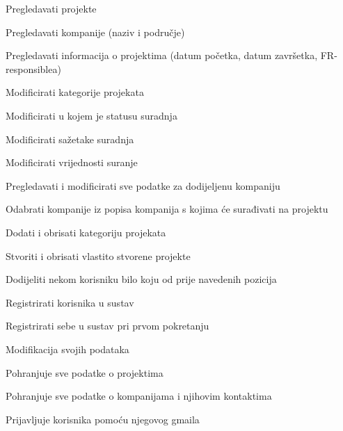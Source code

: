 \begin{packed_enum}
\begin{packed_enum}
				\end{packed_enum}

				\item  {}

				\begin{packed_enum}

					\item Pregledavati projekte
					\item Pregledavati kompanije (naziv i područje)
					\item Pregledavati informacija o projektima (datum početka, datum završetka, FR-responsiblea)
					\item Modificirati kategorije projekata
					\item Modificirati u kojem je statusu suradnja
					\item Modificirati sažetake suradnja
					\item Modificirati vrijednosti suranje
					\item Pregledavati i modificirati sve podatke za dodijeljenu kompaniju
					\item Odabrati kompanije iz popisa kompanija s kojima će surađivati na projektu
					\item Dodati i obrisati kategoriju projekata
					\item Stvoriti i obrisati vlastito stvorene projekte
					\item Dodijeliti nekom korisniku bilo koju od prije navedenih pozicija
					\item Registrirati korisnika u sustav
					\item Registrirati sebe u sustav pri prvom pokretanju
					\item Modifikacija svojih podataka

				\end{packed_enum}
			
				\item  {}
				
				\begin{packed_enum}
					
					\item Pohranjuje sve podatke o projektima
					\item Pohranjuje sve podatke o kompanijama i njihovim kontaktima
					
				\end{packed_enum}

				\item  {}

				\begin{packed_enum}

					\item Prijavljuje korisnika pomoću njegovog gmaila

				\end{packed_enum}
			\end{packed_enum}
			

